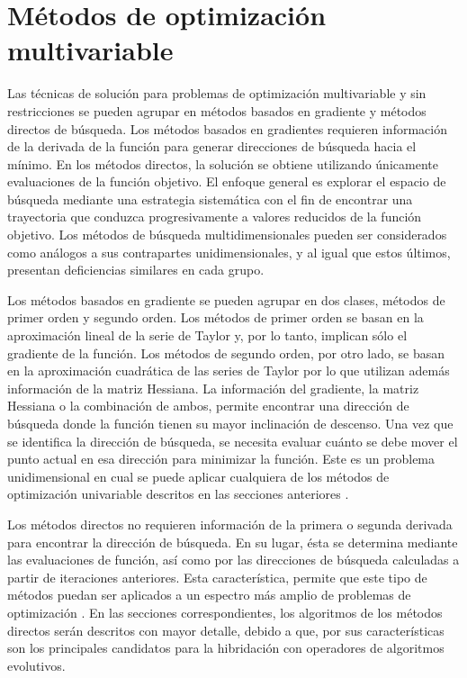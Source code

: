 \section{Métodos de optimización multivariable}\label{sec:Métodos de optimización multivariable}

Las técnicas de solución para problemas de optimización multivariable y sin restricciones se pueden agrupar en métodos basados en gradiente y métodos directos de búsqueda. Los métodos basados en gradientes requieren información de la derivada de la función para generar direcciones de búsqueda hacia el mínimo. En los métodos directos, la solución se obtiene utilizando únicamente evaluaciones de la función objetivo. El enfoque general es explorar el espacio de búsqueda mediante una estrategia sistemática con el fin de encontrar una trayectoria que conduzca progresivamente a valores reducidos de la función objetivo. Los métodos de búsqueda multidimensionales pueden ser considerados como análogos a sus contrapartes unidimensionales, y al igual que estos últimos, presentan deficiencias similares en cada grupo.  

Los métodos basados en gradiente se pueden agrupar en dos clases, métodos de primer orden y segundo orden. Los métodos de primer orden se basan en la aproximación lineal de la serie de Taylor y, por lo tanto, implican sólo el gradiente de la función. Los métodos de segundo orden, por otro lado, se basan en la aproximación cuadrática de las series de Taylor por lo que utilizan además información de la matriz Hessiana. La información del gradiente, la matriz Hessiana o la combinación de ambos, permite encontrar una dirección de búsqueda donde la función tienen su mayor inclinación de descenso. Una vez que se identifica la dirección de búsqueda, se necesita evaluar cuánto se debe mover el punto actual en esa dirección para minimizar la función. Este es un problema unidimensional en cual se puede aplicar cualquiera de los métodos de optimización univariable descritos en las secciones anteriores  \cite{luenberger_linear_2015}.

Los métodos directos no requieren información de la primera o  segunda derivada para encontrar la dirección de búsqueda. En su lugar, ésta se determina mediante las evaluaciones de función, así como por las direcciones de búsqueda calculadas a partir de iteraciones anteriores. Esta característica, permite que este tipo de métodos puedan ser aplicados a un espectro más amplio de problemas de optimización \cite{belegundu_optimization_2011}. En las secciones correspondientes, los algoritmos de los métodos directos serán descritos con mayor detalle, debido a que,  por sus características son los principales candidatos para la hibridación con operadores de algoritmos evolutivos. 

